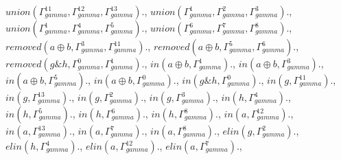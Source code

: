 \documentclass[a4paper, 11pt]{article}
\begin{document}
$union(\Gamma_{gamma}^{11}, \Gamma_{gamma}^{12}, \Gamma_{gamma}^{13}).$, $union(\Gamma_{gamma}^{1}, \Gamma_{gamma}^{2}, \Gamma_{gamma}^{3}).$, $union(\Gamma_{gamma}^{1}, \Gamma_{gamma}^{4}, \Gamma_{gamma}^{5}).$, $union(\Gamma_{gamma}^{6}, \Gamma_{gamma}^{7}, \Gamma_{gamma}^{8}).$, $removed(a \oplus b, \Gamma_{gamma}^{3}, \Gamma_{gamma}^{11}).$, $removed(a \oplus b, \Gamma_{gamma}^{5}, \Gamma_{gamma}^{6}).$, $removed(g \binampersand h, \Gamma_{gamma}^{0}, \Gamma_{gamma}^{1}).$, $in(a \oplus b, \Gamma_{gamma}^{1}).$, $in(a \oplus b, \Gamma_{gamma}^{3}).$, $in(a \oplus b, \Gamma_{gamma}^{5}).$, $in(a \oplus b, \Gamma_{gamma}^{0}).$, $in(g \binampersand h, \Gamma_{gamma}^{0}).$, $in(g, \Gamma_{gamma}^{11}).$, $in(g, \Gamma_{gamma}^{13}).$, $in(g, \Gamma_{gamma}^{2}).$, $in(g, \Gamma_{gamma}^{3}).$, $in(h, \Gamma_{gamma}^{4}).$, $in(h, \Gamma_{gamma}^{5}).$, $in(h, \Gamma_{gamma}^{6}).$, $in(h, \Gamma_{gamma}^{8}).$, $in(a, \Gamma_{gamma}^{12}).$, $in(a, \Gamma_{gamma}^{13}).$, $in(a, \Gamma_{gamma}^{7}).$, $in(a, \Gamma_{gamma}^{8}).$, $elin(g, \Gamma_{gamma}^{2}).$, $elin(h, \Gamma_{gamma}^{4}).$, $elin(a, \Gamma_{gamma}^{12}).$, $elin(a, \Gamma_{gamma}^{7}).$, 
\end{document}
